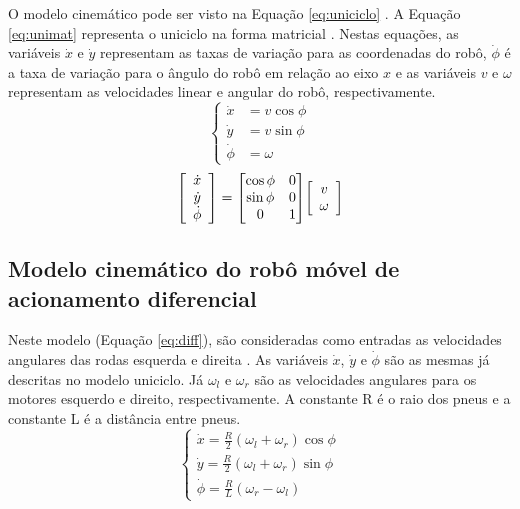 O modelo cinemático pode ser visto na Equação
\ref{eq:uniciclo} \cite{lavalle2006planning}. A Equação \ref{eq:unimat}
representa o uniciclo na forma matricial \cite{Livro_Siegwart}. Nestas equações,
as variáveis $\dot{x}$ e $\dot{y}$ representam as taxas de variação 
para as coordenadas do robô, $\dot{\phi}$ é a taxa de variação para o ângulo do robô
em relação ao eixo $\textit{x}$ e as variáveis $v$ e $\omega$ representam as velocidades
linear e angular do robô, respectivamente.
\begin{equation}
	\label{eq:uniciclo}
	\left \{ \begin{matrix} \dot{x} &= v\cos{\phi} \\ \dot{y} &= v\sin{\phi} \\
	\dot{\phi} &= \omega \end{matrix} \right.
\end{equation}
\begin{equation}
	\label{eq:unimat}
	\mleft[ 
	\begin{array}{c c}
	\dot{x} \\ \dot{y} \\ \dot{\phi}
	\end{array}
	\mright] = \mleft[
	\begin{matrix}
		  \cos{\phi} & 0 \\
		  \sin{\phi} & 0 \\
		  0 & 1 \\
	\end{matrix}
	\mright] \mleft[ 
	\begin{array}{c c}
	v \\ \omega
	\end{array}
	\mright]
\end{equation}

	\subsection{Modelo cinemático do robô móvel de acionamento diferencial}	

Neste modelo (Equação \ref{eq:diff}), são consideradas como entradas as
velocidades angulares das rodas esquerda e direita \cite{lavalle2006planning}. 
As variáveis $\dot{x}$, $\dot{y}$ e $\dot{\phi}$ são as mesmas já descritas no
modelo uniciclo. Já $\omega_l$ e $\omega_r$ são as velocidades angulares para os
motores esquerdo e direito, respectivamente. A constante R é o raio dos pneus e a
constante L é a distância entre pneus.
\begin{equation}
	\label{eq:diff}
	\left \{ \begin{matrix} \dot{x} = \frac{R}{2}(\omega_l +
	\omega_r)\cos{\phi}
	\\
	\dot{y} = \frac{R}{2}(\omega_l +
	\omega_r)\sin{\phi}
	\\
	\dot{\phi} = \frac{R}{L}(\omega_r -
	\omega_l) \end{matrix} \right.
\end{equation}

